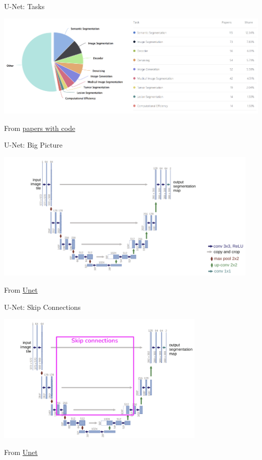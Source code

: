 \documentclass[serif, aspectratio=169]{beamer}
\begin{document}
\begin{frame}{U-Net: Tasks}

    \begin{center}
        \includegraphics[width=1.05\textwidth]{pic/Unet Tasks.png} 
    \end{center}

    \vspace{0.6cm}
    \tiny{From \href{https://paperswithcode.com/method/u-net}{papers with code}}
\end{frame}


\begin{frame}{U-Net: Big Picture}

    \begin{center}
        \includegraphics[width=0.95\textwidth]{pic/Unet big pic1.png} 
    \end{center}
    \tiny{From \href{https://arxiv.org/abs/1505.04597}{Unet}}
\end{frame}


\begin{frame}{U-Net: Skip Connections}

    \begin{center}
        \includegraphics[width=0.75\textwidth]{pic/Unet-Skip connections.png} 
    \end{center}
    \tiny{From \href{https://arxiv.org/abs/1505.04597}{Unet}}
\end{frame}
\end{document}
